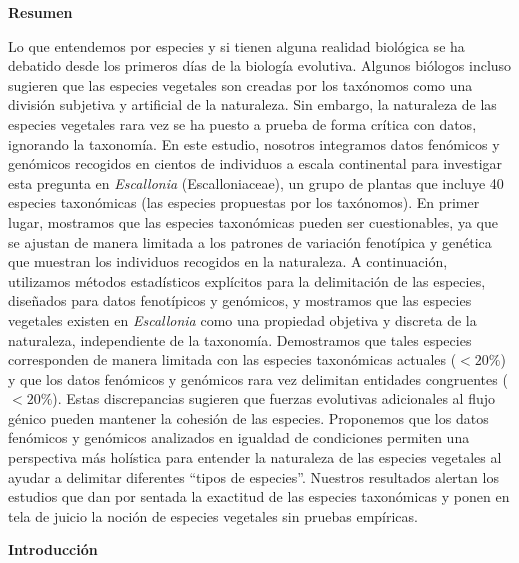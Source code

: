 \documentclass[
  11pt,
]{article}
\begin{document}
\textbf{Resumen}

Lo que entendemos por especies y si tienen alguna realidad biológica se ha debatido desde los primeros días de la biología evolutiva. Algunos biólogos incluso sugieren que las especies vegetales son creadas por los taxónomos como una división subjetiva y artificial de la naturaleza. Sin embargo, la naturaleza de las especies vegetales rara vez se ha puesto a prueba de forma crítica con datos, ignorando la taxonomía. En este estudio, nosotros integramos datos fenómicos y genómicos recogidos en cientos de individuos a escala continental para investigar esta pregunta en \emph{Escallonia} (Escalloniaceae), un grupo de plantas que incluye 40 especies taxonómicas (las especies propuestas por los taxónomos). En primer lugar, mostramos que las especies taxonómicas pueden ser cuestionables, ya que se ajustan de manera limitada a los patrones de variación fenotípica y genética que muestran los individuos recogidos en la naturaleza. A continuación, utilizamos métodos estadísticos explícitos para la delimitación de las especies, diseñados para datos fenotípicos y genómicos, y mostramos que las especies vegetales existen en \emph{Escallonia} como una propiedad objetiva y discreta de la naturaleza, independiente de la taxonomía. Demostramos que tales especies corresponden de manera limitada con las especies taxonómicas actuales (\(< 20\%\)) y que los datos fenómicos y genómicos rara vez delimitan entidades congruentes (\(< 20\%\)). Estas discrepancias sugieren que fuerzas evolutivas adicionales al flujo génico pueden mantener la cohesión de las especies. Proponemos que los datos fenómicos y genómicos analizados en igualdad de condiciones permiten una perspectiva más holística para entender la naturaleza de las especies vegetales al ayudar a delimitar diferentes ``tipos de especies''. Nuestros resultados alertan los estudios que dan por sentada la exactitud de las especies taxonómicas y ponen en tela de juicio la noción de especies vegetales sin pruebas empíricas.

\textbf{Introducción}
\end{document}
